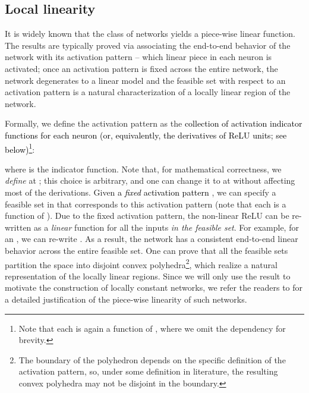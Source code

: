\documentclass{article} \usepackage{iclr2020_conference,times}
\newcommand{\camera}[1]{\textcolor{black}{#1}}
\begin{document}
\subsection{Local linearity}\label{sec:local_linear}
\vspace{-1mm}
It is widely known that the class of networks  yields a piece-wise linear function. The results are typically proved via associating the end-to-end behavior of the network with its activation pattern -- which linear piece in each neuron is activated; once an activation pattern is fixed across the entire network, the network degenerates to a linear model and the feasible set with respect to an activation pattern is a natural characterization of a locally linear region of the network. 



Formally, we define the activation pattern as the \camera{collection of activation indicator functions for each neuron  (or, equivalently, the derivatives of ReLU units; see below)}\footnote{Note that each  is again a function of , where we omit the dependency for brevity.}:

where  is the indicator function. Note that, for mathematical correctness, we \emph{define}  at ; this choice is arbitrary, and one can change it to  at  without affecting most of the derivations.
Given \camera{a \emph{fixed} activation pattern }, we can specify a feasible set in  that corresponds to this activation pattern 
 (note that each  is a function of ). Due to the fixed activation pattern, the non-linear ReLU can be re-written as a \emph{linear} function for all the inputs \emph{in the feasible set}. For example, for an , we can re-write . As a result, the network has a consistent end-to-end linear behavior across the entire feasible set. One can prove that all the feasible sets partition the space  into disjoint convex polyhedra\footnote{The boundary of the polyhedron depends on the specific definition of the activation pattern, so, under some definition in literature, the resulting convex polyhedra may not be disjoint in the boundary.}, which realize a natural representation of the locally linear regions. Since we will only use the result to motivate the construction of locally constant networks, we refer the readers to \citet{lee2018towards} for a detailed justification of the piece-wise linearity of such networks. 






 \vspace{-1mm}
\end{document}
